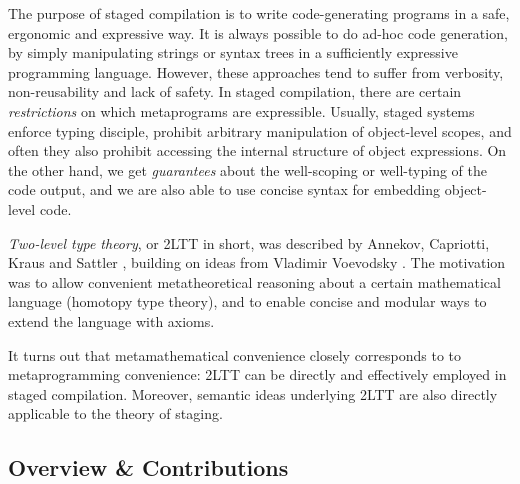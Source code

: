 \documentclass[acmsmall]{acmart}
\theoremstyle{remark}
\begin{document}
The purpose of staged compilation is to write code-generating programs in a
safe, ergonomic and expressive way. It is always possible to do ad-hoc code
generation, by simply manipulating strings or syntax trees in a sufficiently
expressive programming language. However, these approaches tend to suffer from
verbosity, non-reusability and lack of safety. In staged compilation, there are
certain \emph{restrictions} on which metaprograms are expressible. Usually,
staged systems enforce typing disciple, prohibit arbitrary manipulation of
object-level scopes, and often they also prohibit accessing the internal
structure of object expressions. On the other hand, we get \emph{guarantees}
about the well-scoping or well-typing of the code output, and we are also able
to use concise syntax for embedding object-level code.

\emph{Two-level type theory}, or 2LTT in short, was described by Annekov,
Capriotti, Kraus and Sattler \cite{twolevel}, building on ideas from Vladimir
Voevodsky \cite{hts}. The motivation was to allow convenient metatheoretical
reasoning about a certain mathematical language (homotopy type theory), and to
enable concise and modular ways to extend the language with axioms.

It turns out that metamathematical convenience closely corresponds to to
metaprogramming convenience: 2LTT can be directly and effectively employed
in staged compilation. Moreover, semantic ideas underlying 2LTT are also
directly applicable to the theory of staging.

\subsection{Overview \& Contributions}\label{sec:overview}
\end{document}
